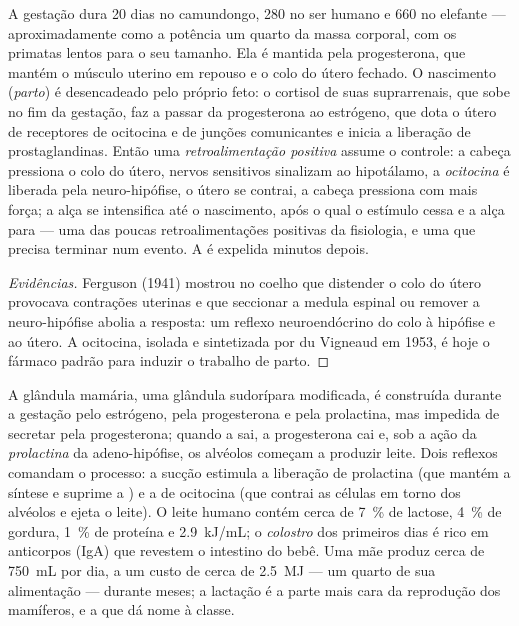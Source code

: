 \begin{proposition}\label{prop:b2:mammal-reproduction:birth}
A gestação dura \num{20} dias no camundongo, \num{280} no ser humano e
\num{660} no elefante --- aproximadamente como a potência um quarto da
massa corporal, com os primatas lentos para o seu tamanho. Ela é
mantida pela progesterona, que mantém o músculo uterino em repouso e o
colo do útero fechado. O nascimento (\emph{parto}) é desencadeado pelo
próprio feto: o cortisol de suas suprarrenais, que sobe no fim da
gestação, faz a  passar da progesterona ao estrógeno, que dota
o útero de receptores de ocitocina e de junções comunicantes e inicia
a liberação de prostaglandinas. Então uma \emph{retroalimentação
positiva} assume o controle: a cabeça pressiona o colo do útero,
nervos sensitivos sinalizam ao hipotálamo, a \emph{ocitocina} é
liberada pela neuro-hipófise, o útero se contrai, a cabeça pressiona
com mais força; a alça se intensifica até o nascimento, após o qual o
estímulo cessa e a alça para --- uma das poucas retroalimentações
positivas da fisiologia, e uma que precisa terminar num evento. A
 é expelida minutos depois.
\end{proposition}
\begin{proof}[Evidências]
Ferguson (1941) mostrou no coelho que distender o colo do útero
provocava contrações uterinas e que seccionar a medula espinal ou
remover a neuro-hipófise abolia a resposta: um reflexo neuroendócrino
do colo à hipófise e ao útero. A ocitocina, isolada e sintetizada por
du Vigneaud em 1953, é hoje o fármaco padrão para induzir o trabalho
de parto.
\end{proof}

\begin{proposition}[A lactação]\label{prop:b2:mammal-reproduction:lactation}
A glândula mamária, uma glândula sudorípara modificada, é construída
durante a gestação pelo estrógeno, pela progesterona e pela prolactina,
mas impedida de secretar pela progesterona; quando a  sai, a
progesterona cai e, sob a ação da \emph{prolactina} da adeno-hipófise,
os alvéolos começam a produzir leite. Dois reflexos comandam o
processo: a sucção estimula a liberação de prolactina (que mantém a
síntese e suprime a ) e a de ocitocina (que contrai as células
em torno dos alvéolos e ejeta o leite). O leite humano contém cerca de
\qty{7}{\%} de lactose, \qty{4}{\%} de gordura, \qty{1}{\%} de
proteína e \qty{2.9}{kJ/mL}; o \emph{colostro} dos primeiros dias é
rico em anticorpos (IgA) que revestem o intestino do bebê. Uma mãe
produz cerca de \qty{750}{mL} por dia, a um custo de cerca de
\qty{2.5}{MJ} --- um quarto de sua alimentação --- durante meses; a
lactação é a parte mais cara da reprodução dos mamíferos, e a que dá
nome à classe.
\end{proposition}


